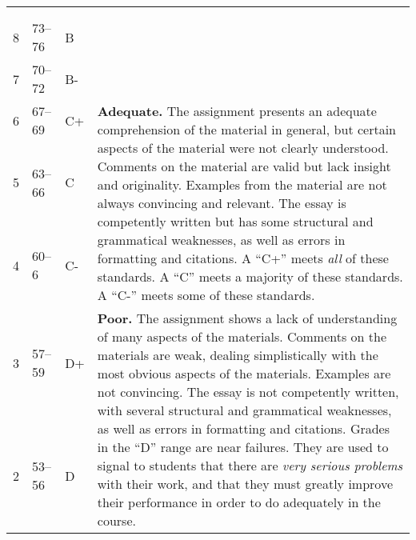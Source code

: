 \documentclass[12pt]{article}
\begin{document}
{\begin{tabular}{|l|l|l|l|}
& & & \\
& & & \\
\multirow{3}{*}{8} & \multirow{3}{*}{73--76} & \multirow{3}{*}{B} & \\
& & & \\
& & & \\
\multirow{3}{*}{7} & \multirow{3}{*}{70--72} & \multirow{3}{*}{B-} & \\
& & & \\
& & & \\
\hline
\multirow{3}{*}{6} & \multirow{3}{*}{67--69} & \multirow{3}{*}{C+} & \multirow{9}{4in}{\textbf{Adequate.} The assignment presents an adequate comprehension of the material in general, but certain aspects of the material were not clearly understood. Comments on the material are valid but lack insight and originality. Examples from the material are not always convincing and relevant. The essay is competently written but has some structural and grammatical weaknesses, as well as errors in formatting and citations. A ``C+'' meets \textit{all} of these standards. A ``C'' meets a majority of these standards. A ``C-'' meets some of these standards.} \\
& & & \\
& & & \\
\multirow{3}{*}{5} & \multirow{3}{*}{63--66} & \multirow{3}{*}{C} & \\
& & & \\
& & & \\
\multirow{3}{*}{4} & \multirow{3}{*}{60--6} & \multirow{3}{*}{C-} & \\
& & & \\
& & & \\
\hline
\multirow{3}{*}{3} & \multirow{3}{*}{57--59} & \multirow{3}{*}{D+} & \multirow{9}{4in}{\textbf{Poor.} The assignment shows a lack of understanding of many aspects of the materials. Comments on the materials are weak, dealing simplistically with the most obvious aspects of the materials. Examples are not convincing. The essay is not competently written, with several structural and grammatical weaknesses, as well as errors in formatting and citations. Grades in the ``D'' range are near failures. They are used to signal to students that there are \textit{very serious problems} with their work, and that they must greatly improve their performance in order to do adequately in the course.} \\
& & & \\
& & & \\
\multirow{3}{*}{2} & \multirow{3}{*}{53--56} & \multirow{3}{*}{D} & \\

\end{tabular}}
\end{document}
